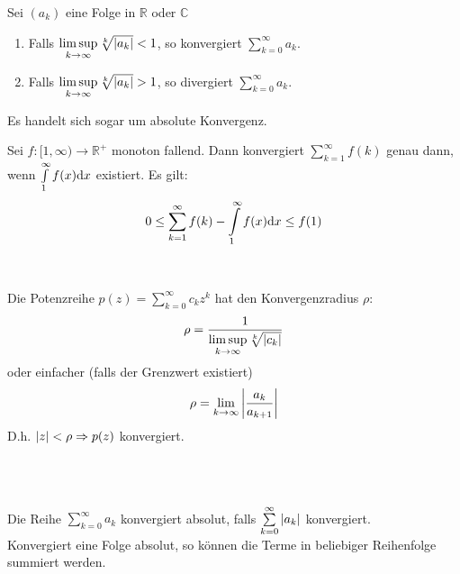 \begin{multicols}{2}
\begin{theorem}[Wurzelkriterium]
			Sei $(a_k)$ eine Folge in $\mathbb{R}$ oder $\mathbb{C}$
			\begin{enumerate}
				\item Falls $ \limsup\limits_{k \to \infty} \sqrt[k]{\left\vert a_k \right\vert} < 1 $, so konvergiert $\sum\limits_{k = 0}^{\infty} a_k$.
				\item Falls $ \limsup\limits_{k \to \infty} \sqrt[k]{\left\vert a_k \right\vert} > 1 $, so divergiert $\sum\limits_{k = 0}^{\infty} a_k$.
			\end{enumerate}
			Es handelt sich sogar um absolute Konvergenz.
		\end{theorem}
		\begin{theorem}[Integral]
			Sei $f:[1,\infty) \to \mathbb{R}^+$ monoton fallend. Dann konvergiert $\sum\limits_{k = 1}^{\infty}f(k)$ genau dann, wenn $\int\limits_{1}^{\infty}f(x) \mathrm{d} x$ existiert. Es gilt:
			$$ 0 \leq \sum\limits_{k = 1}^{\infty}f(k) - \int\limits_{1}^{\infty}f(x) \mathrm{d} x \leq f(1)$$
		\end{theorem}
		\\[1em]
		\begin{theorem}[Konvergenzradius]
			Die Potenzreihe $p(z) = \sum\limits_{k = 0}^{\infty} c_k z^k$ hat den Konvergenzradius $\rho$:
			$$ \rho = \frac{1}{\limsup\limits_{k \to \infty} \sqrt[k]{\left\vert c_k \right\vert}} $$
			oder einfacher (falls der Grenzwert existiert)
			$$ \rho = \lim\limits_{k \to \infty} \left\vert \frac{a_k}{a_{k + 1}} \right\vert $$
			D.h. $\left\vert z \right\vert < \rho \Rightarrow p(z)$ konvergiert.
		\end{theorem}
		\\[1em]
		\begin{definition}\hfill\\
			Die Reihe $\sum\limits_{k = 0}^{\infty} a_k$ konvergiert absolut, falls $\sum\limits_{k = 0}^{\infty} \left\vert a_k \right\vert$ konvergiert.\\
			Konvergiert eine Folge absolut, so können die Terme in beliebiger Reihenfolge summiert werden.
		\end{definition}
\end{multicols}		